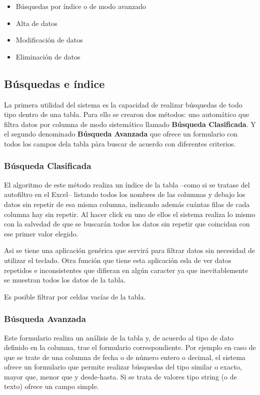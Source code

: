 \documentclass[a4paper,10pt]{article}
\begin{document}
\begin{itemize}
 \item Búsquedas por índice o de modo avanzado
 \item Alta de datos
 \item Modificación de datos 
 \item Eliminación de datos
\end{itemize}


\subsection{Búsquedas e índice}

La primera utilidad del sistema es la capacidad de realizar búsquedas de todo tipo dentro de una tabla. Para ello se crearon dos métodos: uno automático que filtra datos por columna de modo sistemático llamado \textbf{Búsqueda Clasificada}. Y el segundo denominado \textbf{Búsqueda Avanzada} que ofrece un formulario con todos los campos dela tabla pàra buscar de acuerdo con diferentes criterios.

\subsubsection{Búsqueda Clasificada}

El algoritmo de este método realiza un índice de la tabla --como si se tratase del autofiltro en el Excel-- listando todos los nombres de las columnas y debajo los datos sin repetir de esa misma columna, indicando además cuántas filas de cada columna hay sin repetir. Al hacer click en uno de ellos el sistema realiza lo mismo con la salvedad de que se buscarán todos los datos sin repetir que coincidan con ese primer valor elegido.

Asi se tiene una aplicación genérica que servirá para filtrar datos sin necesidad de utilizar el teclado. Otra función que tiene esta aplicación esla de ver datos repetidos e inconsistentes que difieran en algún caracter ya que inevitablemente se muestran todos los datos de la tabla.

Es posible filtrar por celdas vacías de la tabla. 


\subsubsection{Búsqueda Avanzada}

Este formulario realiza un análisis de la tabla y, de acuerdo al tipo de dato definido en la columna, trae el formulario correspondiente. Por ejemplo en caso de que se trate de una columna de fecha o de número entero o decimal, el sistema ofrece un formulario que permite realizar búsquedas del tipo similar o exacto, mayor que, menor que y desde-hasta. Si se trata de valores tipo string (o de texto) ofrece un campo simple.
\end{document}
